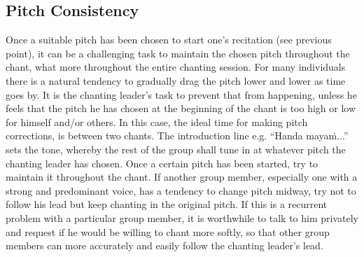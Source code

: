 \subsection*{Pitch Consistency}
\begin{justify}
  Once a suitable pitch has been chosen to start one's recitation (see previous point), it can be a challenging task to maintain the chosen pitch throughout the chant, what more throughout the entire chanting session. For many individuals there is a natural tendency to gradually drag the pitch lower and lower as time goes by. It is the chanting leader's task to prevent that from happening, unless he feels that the pitch he has chosen at the beginning of the chant is too high or low for himself and/or others. In this case, the ideal time for making pitch corrections, is between two chants. The introduction line e.g. ``Handa mayaṁ...'' sets the tone, whereby the rest of the group shall tune in at whatever pitch the chanting leader has chosen. Once a certain pitch has been started, try to maintain it throughout the chant. If another group member, especially one with a strong and predominant voice, has a tendency to change pitch midway, try not to follow his lead but keep chanting in the original pitch. If this is a recurrent problem with a particular group member, it is worthwhile to talk to him privately and request if he would be willing to chant more softly, so that other group members can more accurately and easily follow the chanting leader's lead.
\end{justify}

